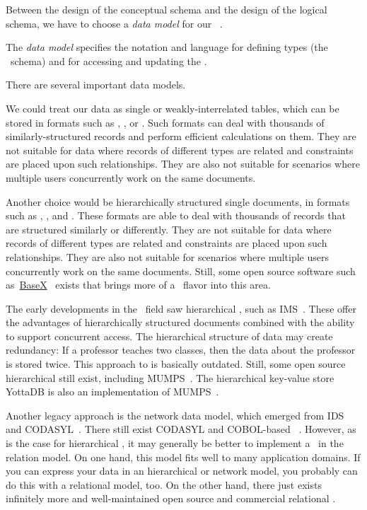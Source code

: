%
\label{sec:dbModelSelection}%
%
Between the design of the conceptual schema and the design of the logical schema, we have to choose a \emph{data model} for our \db~\cite{SS2005EIDDDFDB:I}.%
%
\begin{definition}%
The \emph{data model} specifies the notation and language for defining types (the \db\ schema) and for accessing and updating the \db.%
\end{definition}%
%
There are several important data models.

We could treat our data as single or weakly-interrelated tables, which can be stored in formats such as , , or .
Such formats can deal with thousands of similarly-structured records and perform efficient calculations on them.
They are not suitable for data where records of different types are related and constraints are placed upon such relationships.
They are also not suitable for scenarios where multiple users concurrently work on the same documents.

Another choice would be hierarchically structured single documents, in formats such as , , and .
These formats are able to deal with thousands of records that are structured similarly or differently.
They are not suitable for data where records of different types are related and constraints are placed upon such relationships.
They are also not suitable for scenarios where multiple users concurrently work on the same documents.
Still, some open source software such as~\href{https://basex.org}{BaseX}~\cite{GHS2010B,G2006PXMMDTTL} exists that brings more of a \db\ flavor into this area.

The early developments in the \db\ field saw hierarchical , such as IMS~\cite{KLBGNLWBS2012ITIYCGTIIMS,BBP2007TBOI,KC2024DS:ITD}.
These offer the advantages of hierarchically structured documents combined with the ability to support concurrent access.
The hierarchical structure of data may create redundancy:
If a professor teaches two classes, then the data about the professor is stored twice.
This approach to  is basically outdated.
Still, some open source hierarchical  still exist, including MUMPS~\cite{O2008TMPL,O2025TMPL}.
The hierarchical key-value store YottaDB is also an implementation of MUMPS~\cite{B2018THALOMMATFOY}.

Another legacy approach is the network data model, which emerged from IDS~\cite{B2009TOOTIDSITFDAD,B1965SFRAP,H2016HCBITDAFOODW} and CODASYL~\cite{TF1976CDBMS}.
There still exist CODASYL and COBOL-based ~\cite{O2022OCDDARM}.
However, as is the case for hierarchical , it may generally be better to implement a \db\ in the relation model.
On one hand, this model fits well to many application domains.
If you can express your data in an hierarchical or network model, you probably can do this with a relational model, too.
On the other hand, there just exists infinitely more and well-maintained open source and commercial relational .

